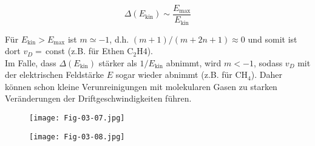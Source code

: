 \[\Delta(E_\text{kin}) \sim \frac{E_\text{max}}{E_\text{kin}}  \]

Für $E_\text{kin}>E_\text{max}$ ist $m\simeq -1$, d.h. $(m+1)/(m+2n+1)\approx 0$ und somit ist dort
$v_D=\,$const (z.B. für Ethen C$_2$H$4$).
\\
Im Falle, dass $\Delta(E_\text{kin})$ stärker als $1/E_\text{kin}$ abnimmt, wird $m<-1$, sodass
$v_D$ mit der elektrischen Feldstärke $E$ sogar wieder abnimmt (z.B. für CH$_4$). Daher können schon
kleine Verunreinigungen mit molekularen Gasen zu starken Veränderungen der Driftgeschwindigkeiten
führen.

\begin{figure}[H]
	\centering
	\texttt{[image: Fig-03-07.jpg]}
\end{figure}

\begin{figure}[H]
	\centering
	\texttt{[image: Fig-03-08.jpg]}
\end{figure}
